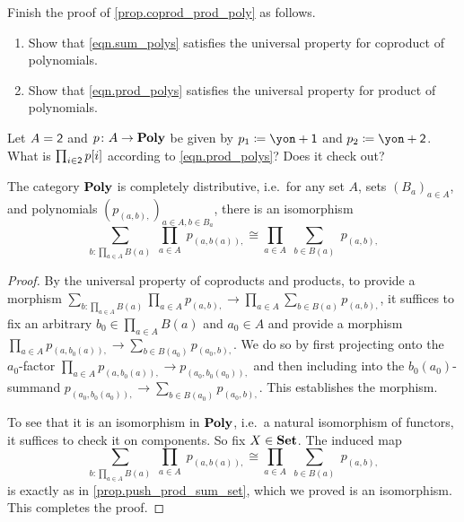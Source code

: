 \documentclass[DynamicalBook]{subfiles}
\begin{document}
\begin{exercise}\label{exc.check_coprod_prod}
Finish the proof of \cref{prop.coprod_prod_poly} as follows.
\begin{enumerate}
	\item Show that \eqref{eqn.sum_polys} satisfies the universal property for coproduct of polynomials.
	\item Show that \eqref{eqn.prod_polys} satisfies the universal property for product of polynomials.
\qedhere
\end{enumerate}
\end{exercise}

\begin{exercise}
Let $A=\textsf{2}$ and $p\colon A\to\textbf{Poly}$ be given by $p_1\coloneqq\yon+\1$ and $p_2\coloneqq\yon+\2$. What is $\prod_{i\in\textsf{2}}p[i]$ according to \cref{eqn.prod_polys}? Does it check out?
\end{exercise}

\begin{proposition}\label{prop.completely_distributive}
The category $\textbf{Poly}$ is completely distributive, i.e.\ for any set $A$, sets $(B_a)_{a\in A}$, and polynomials $(p_{(a,b),})_{a\in A, b\in B_a}$, there is an isomorphism
\[
  \sum_{b\colon\prod_{a\in A}B(a)}\;\prod_{a\in A}\;p_{(a,b(a)),}
  \cong
	\prod_{a\in A}\;\sum_{b\in B(a)}\;p_{(a,b),}
\]
\end{proposition}
\begin{proof}
By the universal property of coproducts and products, to provide a morphism $\sum_{b\colon\prod_{a\in A}B(a)}\prod_{a\in A}p_{(a,b),}
  \to	\prod_{a\in A}\sum_{b\in B(a)}p_{(a,b),}$, it suffices to fix an arbitrary $b_0\in\prod_{a\in A}B(a)$ and $a_0\in A$ and provide a morphism $\prod_{a\in A}p_{(a,b_0(a)),}\to\sum_{b\in B(a_0)}p_{(a_0,b),}$. We do so by first projecting onto the $a_0$-factor $\prod_{a\in A}p_{(a,b_0(a)),}\to p_{(a_0, b_0(a_0)),}$ and then including into the $b_0(a_0)$-summand $p_{(a_0,b_0(a_0)),}\to\sum_{b\in B(a_0)}p_{(a_0,b),}$. This establishes the morphism.
  
  To see that it is an isomorphism in $\textbf{Poly}$, i.e.\ a natural isomorphism of functors, it suffices to check it on components. So fix $X\in\textbf{Set}$. The induced map
  \[
  \sum_{b\colon\prod_{a\in A}B(a)}\;\prod_{a\in A}\;p_{(a,b(a)),}
  \cong
	\prod_{a\in A}\;\sum_{b\in B(a)}\;p_{(a,b),}
  \]
  is exactly as in \cref{prop.push_prod_sum_set}, which we proved is an isomorphism. This completes the proof.
\end{proof}
\end{document}
